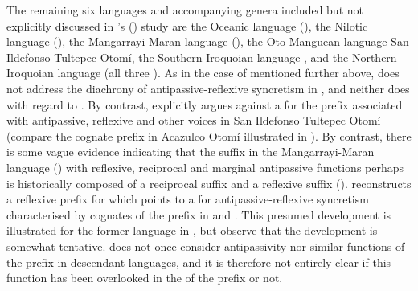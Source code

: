 The remaining six languages and accompanying genera included but not explicitly discussed in \citeauthor{sanso:2017}’s (\citeyear{sanso:2017}) study are the Oceanic language  (), the Nilotic language  (), the Mangarrayi-Maran language  (), the Oto-Manguean language San Ildefonso Tultepec Otomí, the Southern Iroquoian language , and the Northern Iroquoian language  (all three ). As in the case of  mentioned further above, \cite{barbor:2012} does not address the diachrony of antipassive-reflexive syncretism in , and neither does \cite{storch:2014} with regard to . By contrast, \cite[157ff.]{palancar:2009} explicitly argues against a  for the prefix  associated with antipassive, reflexive and other voices in San Ildefonso Tultepec Otomí (compare the cognate prefix in Acazulco Otomí illustrated in ). By contrast, there is some vague evidence indicating that the suffix  in the Mangarrayi-Maran language  () with reflexive, reciprocal and marginal antipassive functions perhaps is historically composed of a reciprocal suffix  and a reflexive suffix  (). \cite{julian:2010} reconstructs a reflexive prefix  for  which points to a  for antipassive-reflexive syncretism characterised by cognates of the prefix in  and . This presumed development is illustrated for the former language in  \citep[343ff., 366, 371]{montgomery-anderson:2008}, but observe that the development is somewhat tentative. \cite{julian:2010} does not once consider antipassivity nor similar functions of the prefix in descendant languages, and it is therefore not entirely clear if this function has been overlooked in the  of the  prefix or not.

